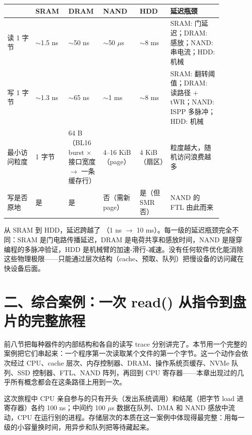 \begin{longtable}{L{0.12\linewidth}L{0.135\linewidth}L{0.135\linewidth}L{0.135\linewidth}L{0.135\linewidth}L{0.22\linewidth}}
\toprule
& SRAM & DRAM & NAND & HDD & 延迟瓶颈 \\
\midrule
读 1 字节 & $\sim$1.5 ns & $\sim$50 ns & $\sim$50 $\mu$s & $\sim$8 ms & SRAM: 门延迟；DRAM: 感放；NAND: 串电流；HDD: 机械 \\\tablerowrule
写 1 字节 & $\sim$1.3 ns & $\sim$65 ns & $\sim$1 ms & $\sim$8 ms & SRAM: 翻转阈值；DRAM: 读路径 + tWR；NAND: ISPP 多脉冲；HDD: 机械 \\\tablerowrule
最小访问粒度 & 1 字节 & 64 B（BL16 burst $\times$ 接口宽度 $\to$ 一条缓存行） & 4--16 KiB（page） & 4 KiB（扇区） & 粒度越大，随机访问浪费越多 \\\tablerowrule
写是否原地 & 是 & 是 & 否（需新 page） & 是（但 SMR 否） & NAND 的 FTL 由此而来 \\
\bottomrule
\end{longtable}

从 SRAM 到 HDD，延迟跨越了 （1 ns $\to$ 10 ms）。每一级的延迟瓶颈完全不同：SRAM 是门电路传播延迟，DRAM 是电荷共享和感放时间，NAND 是隧穿编程的多脉冲验证，HDD 是机械臂的加速-滑行-减速。没有任何软件优化能消除这些物理极限——只能通过层次结构（cache、预取、队列）把慢设备的访问藏在快设备后面。

\section{二、综合案例：一次 read() 从指令到盘片的完整旅程}

前八节把每种器件的内部结构和各自的读写 trace 分别讲完了。本节用一个完整的案例把它们串起来：一个程序第一次读取某个文件的第一个字节。这一个动作会依次经过 CPU、cache 层次、内存控制器、DRAM、操作系统页缓存、NVMe 队列、SSD 控制器、FTL、NAND 阵列，再回到 CPU 寄存器——本章出现过的几乎所有概念都会在这条路径上用到一次。

\begin{keyidea}
这次旅程中 CPU 亲自参与的只有开头（发出系统调用）和结尾（把字节 load 进寄存器）各约 100 ns；中间约 100 $\mu$s 数据在队列、DMA 和 NAND 感放中流动，CPU 在运行别的进程。存储层次的本质在这一案例中体现得最完整：用每一级的小容量换时间，用异步和队列把等待藏起来。
\end{keyidea}


